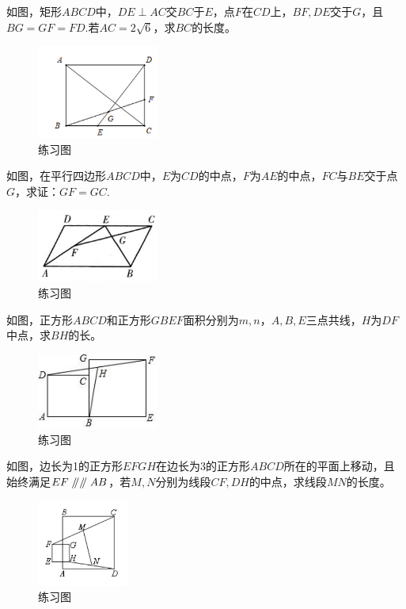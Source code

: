 \documentclass{ecnuthesis}
\newcommand\px{\mathrel{/\mkern-5mu/}}  %
\begin{document}
\begin{problem}
    如图，矩形$ABCD$中，$DE\perp AC$交$BC$于$E$，点$F$在$CD$上，$BF,DE$交于$G$，且$BG=GF=FD.$若$AC=2\sqrt6$，求$BC$的长度。
\end{problem}
\begin{figure}[H]
\centering
\includegraphics[width=4cm]{picture/600.png}
\caption{练习图}
\end{figure}
\begin{problem}
    如图，在平行四边形$ABCD$中，$E$为$CD$的中点，$F$为$AE$的中点，$FC$与$BE$交于点$G$，求证：$GF=GC$.
\end{problem}
\begin{figure}[H]
\centering
\includegraphics[width=4cm]{picture/686.png}
\caption{练习图}
\end{figure}
\begin{problem}
    如图，正方形$ABCD$和正方形$GBEF$面积分别为$m,n$，$A,B,E$三点共线，$H$为$DF$中点，求$BH$的长。
\end{problem}
\begin{figure}[H]
\centering
\includegraphics[width=4cm]{picture/621.jpg}
\caption{练习图}
\end{figure}
\begin{problem}
    如图，边长为1的正方形$EFGH$在边长为3的正方形$ABCD$所在的平面上移动，且始终满足$EF\px \px AB$，若$M,N$分别为线段$CF,DH$的中点，求线段$MN$的长度。
\end{problem}
\begin{figure}[H]
\centering
\includegraphics[width=3cm]{picture/622.png}
\caption{练习图}
\end{figure}
\end{document}
